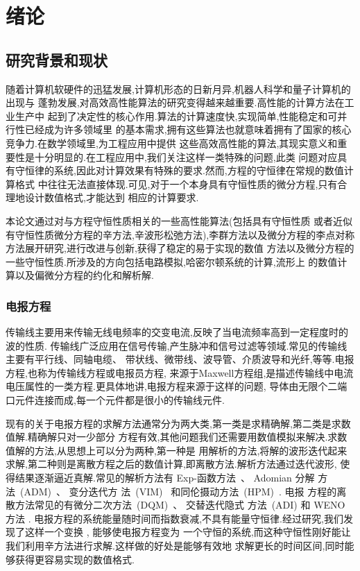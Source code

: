 \chapter{绪论}

\section{研究背景和现状}

随着计算机软硬件的迅猛发展,计算机形态的日新月异,机器人科学和量子计算机的出现与
蓬勃发展,对高效高性能算法的研究变得越来越重要.高性能的计算方法在工业生产中
起到了决定性的核心作用.算法的计算速度快,实现简单,性能稳定和可并行性已经成为许多领域里
的基本需求,拥有这些算法也就意味着拥有了国家的核心竞争力.在数学领域里,为工程应用中提供
这些高效高性能的算法,其现实意义和重要性是十分明显的.在工程应用中,我们关注这样一类特殊的问题,此类
问题对应具有守恒律的系统,因此对计算效果有特殊的要求.然而,方程的守恒律在常规的数值计算格式
中往往无法直接体现.可见,对于一个本身具有守恒性质的微分方程,只有合理地设计数值格式,才能达到
相应的计算要求.

本论文通过对与方程守恒性质相关的一些高性能算法(包括具有守恒性质
或者近似有守恒性质微分方程的辛方法,辛波形松弛方法),李群方法以及微分方程的李点对称方法展开研究,进行改进与创新,获得了稳定的易于实现的数值
方法以及微分方程的一些守恒性质.所涉及的方向包括电路模拟,哈密尔顿系统的计算,流形上
的数值计算以及偏微分方程的约化和解析解.

\subsection{电报方程}

传输线主要用来传输无线电频率的交变电流,反映了当电流频率高到一定程度时的波的性质.
传输线广泛应用在信号传输,产生脉冲和信号过滤等领域.常见的传输线主要有平行线、同轴电缆、
带状线、微带线、波导管、介质波导和光纤,等等.电报方程,也称为传输线方程或电报员方程,
来源于Maxwell方程组,是描述传输线中电流电压属性的一类方程.更具体地讲,电报方程来源于这样的问题,
导体由无限个二端口元件连接而成,每一个元件都是很小的传输线元件.

现有的关于电报方程的求解方法通常分为两大类,第一类是求精确解,第二类是求数值解.精确解只对一少部分
方程有效,其他问题我们还需要用数值模拟来解决.求数值解的方法,从思想上可以分为两种,第一种是
用解析的方法,将解的波形迭代起来求解,第二种则是离散方程之后的数值计算,即离散方法.解析方法通过迭代波形,
使得结果逐渐逼近真解.常见的解析方法有 Exp-函数方法~\cite{naher2011exp}、 Adomian 分解
方法~(ADM)~\cite{adomian1988areview,sheikholeslami2012analytical}、 变分迭代方
法~(VIM)~\cite{wu2013variational} 和同伦摄动方法~(HPM)~\cite{sheikholeslami2012homotopy}. 电报
方程的离散方法常见的有微分二次方法~(DQM)~\cite{jiwari2012numerical}、 交替迭代隐式
方法~(ADI) \cite{cui2013convergence} 和 WENO 方法 \cite{borges2008improved,shen2014improvement}.
电报方程的系统能量随时间而指数衰减,不具有能量守恒律.经过研究,我们发现了这样一个变换 \cite{polyanin2001handbook}, 能够使电报方程变为
一个守恒的系统,而这种守恒性刚好能让我们利用辛方法进行求解.这样做的好处是能够有效地
求解更长的时间区间,同时能够获得更容易实现的数值格式.

